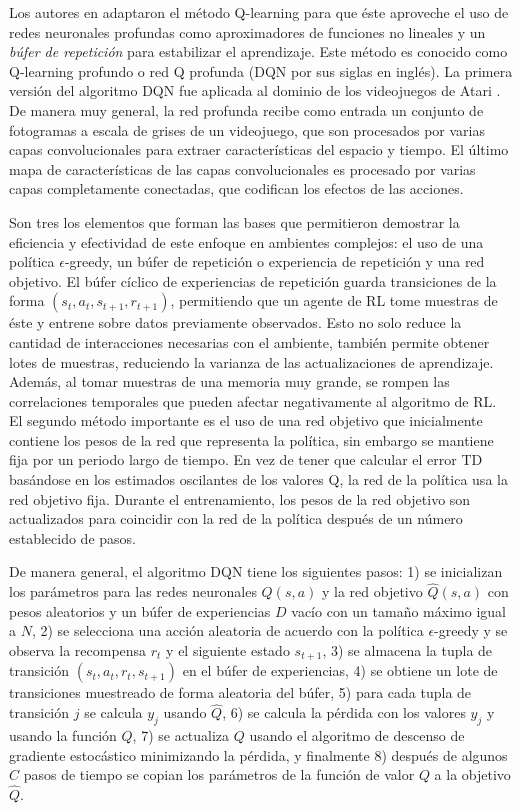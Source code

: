 Los autores en \cite{mnih2013playing} adaptaron el método Q-learning 
para que éste aproveche el uso de redes neuronales profundas como aproximadores
de funciones no lineales y un \textit{búfer de repetición} para estabilizar 
el aprendizaje. Este método es conocido como Q-learning profundo o red Q profunda (DQN por sus siglas en inglés).
La primera versión del algoritmo DQN fue aplicada al dominio de los videojuegos de Atari \cite{bellemare2013arcade}. De manera muy general, la red profunda recibe como entrada un conjunto de fotogramas a escala de grises de un videojuego, que son procesados por varias capas convolucionales para
extraer características del espacio y tiempo. El último mapa de características
de las capas convolucionales es procesado por varias capas completamente conectadas, que codifican los efectos de las acciones.

Son tres los elementos que forman las bases que permitieron demostrar
la eficiencia y efectividad de este enfoque en ambientes complejos: el uso de una política $\epsilon$-greedy, un búfer de repetición o experiencia de repetición \cite{lin1993reinforcement} y una red objetivo.
El búfer cíclico de experiencias de repetición guarda transiciones de la forma 
$(s_t, a_t, s_{t+1}, r_{t+1})$, permitiendo que un agente de RL 
tome muestras de éste y entrene sobre datos previamente observados. 
Esto no solo reduce la cantidad de interacciones necesarias con el ambiente,
también permite obtener lotes de muestras, reduciendo la varianza de 
las actualizaciones de aprendizaje. Además, al tomar muestras de una memoria
muy grande, se rompen las correlaciones temporales que pueden afectar negativamente al algoritmo de RL.
El segundo método importante es el uso de una red objetivo que inicialmente contiene los pesos de la red que representa la política, sin embargo se mantiene
fija por un periodo largo de tiempo.
En vez de tener que calcular el error TD basándose en los estimados
oscilantes de los valores Q, la red de la política usa la red objetivo fija.
Durante el entrenamiento, los pesos de la red objetivo son actualizados 
para coincidir con la red de la política después de un número establecido de pasos.

De manera general, el algoritmo DQN tiene los siguientes pasos: 1) se inicializan los parámetros para las redes neuronales $Q(s, a)$ y la red objetivo $\hat{Q}(s, a)$ con pesos aleatorios y 
un búfer de experiencias $D$ vacío con un tamaño máximo igual a $N$, 2) se selecciona
una acción aleatoria de acuerdo con la política $\epsilon$-greedy y se observa
la recompensa $r_t$ y el siguiente estado $s_{t+1}$, 3) se almacena la tupla
de transición $(s_t, a_t, r_t, s_{t+1})$ en el búfer de experiencias, 4)
se obtiene un lote de transiciones muestreado de forma aleatoria del búfer, 5)
para cada tupla de transición $j$ se calcula $y_j$ usando $\hat{Q}$, 6) se calcula la pérdida con los
valores $y_j$ y usando la función $Q$, 7) se actualiza $Q$ usando el algoritmo de descenso
de gradiente estocástico minimizando la pérdida, y finalmente 8) después de algunos $C$
pasos de tiempo se copian los parámetros de la función de valor $Q$ a la objetivo $\hat{Q}$.

